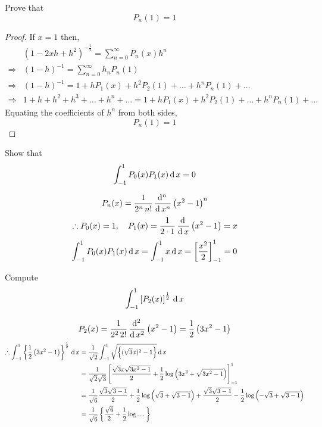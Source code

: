 \documentclass[../main-sheet.tex]{subfiles}
\begin{document}
\begin{prob}
    Prove that
    \[
        P_n(1)=1
    \]
\end{prob}
\begin{proof}
    If $ x=1 $ then,
    \begin{align*}
        & \left(1-2xh+h^2\right)^{-\frac{1}{2}}=\sum_{n=0}^{\infty}P_n(x)h^n\\
        \Rightarrow & (1-h)^{-1}=\sum_{n=0}^\infty h_nP_n(1)\\
        \Rightarrow & (1-h)^{-1}=1+hP_1(x)+h^2P_2(1)+\dots+h^nP_n(1)+\dots\\
        \Rightarrow & 1+h+h^2+h^3+\dots+h^n+\dots=1+hP_1(x)+h^2P_2(1)+\dots+h^nP_n(1)+\dots
    \end{align*}
    Equating the coefficients of $ h^n $ from both sides,
    \[
        P_n(1)=1
    \]
\end{proof}
\newpage
\begin{prob}
    Show that 
    \[
        \int_{-1}^1 P_0(x)P_1(x)\,\mathrm{d}\, x=0
    \]
\end{prob}
\begin{soln}
    \[
        P_n(x)=\frac{1}{2^n\,n!}\,\frac{\mathrm{d}^{n}\, }{\mathrm{d}\, x^{n}}\left(x^2-1\right)^n
    \]
    \[
        \therefore P_0(x)=1,\quad P_1(x)=\frac{1}{2\cdot1}\,\frac{\mathrm{d}\,}{\mathrm{d}\,x}\left(x^2-1\right)=x
    \]
    \[
        \int_{-1}^1 P_0(x)P_1(x)\,\mathrm{d}\, x=\int_{-1}^1x\,\mathrm{d}\, x=\left[ \frac{x^2}{2} \right]_{-1}^1=0
    \]
\end{soln}
\begin{prob}
    Compute
    \[
        \int_{-1}^1\left[ P_2(x) \right]^{\frac{1}{2}}\,\mathrm{d}\, x
    \]
\end{prob}
\begin{soln}
    \[
        P_2(x)=\frac{1}{2^2\,2!}\,\frac{\mathrm{d}^{2}\, }{\mathrm{d}\, x^{2}}\left(x^2-1\right)=\frac{1}{2}\left(3x^2-1\right)
    \]
    \begin{align*}
        \therefore \int_{-1}^1\left\{ \frac{1}{2}\left(3x^2-1\right) \right\}^{\frac{1}{2}}\,\mathrm{d}\, x&=\frac{1}{\sqrt{2}}\int_{-1}^1 \sqrt{\left\{ (\sqrt{3}x)^2-1\right\}}\,\mathrm{d}\, x\\
        &=\frac{1}{\sqrt{2}\sqrt{3}}\left[ \frac{\sqrt{3}x\sqrt{3x^2-1}}{2}+\frac{1}{2}\log \left( 3x^2+\sqrt{3x^2-1} \right) \right]_{-1}^1\\
        &=\frac{1}{\sqrt{6}}\frac{\sqrt{3}\sqrt{3-1}}{2}+\frac{1}{2}\log \left( \sqrt{3}+\sqrt{3-1} \right)+\frac{\sqrt{3}\sqrt{3-1}}{2}-\frac{1}{2}\log\left( -\sqrt{3}+\sqrt{3-1} \right)\\
        &=\frac{1}{\sqrt{6}}\left\{ \frac{\sqrt{6}}{2}+\frac{1}{2}\log \dots\right\} 
    \end{align*}
\end{soln}
\end{document}
